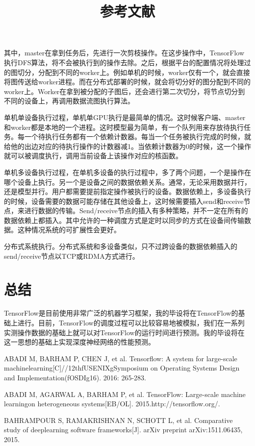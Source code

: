 其中，master在拿到任务后，先进行一次剪枝操作。在这步操作中，TensorFlow执行DFS算法，将不会被执行到的操作去除。之后，根据平台的配置情况将处理过的图切分，分配到不同的worker上。例如单机的时候，worker仅有一个，就会直接将图传送给worker进程。而在分布式部署的时候，就会将切分好的图分配到不同的worker上。Worker在拿到被分配的子图后，还会进行第二次切分，将节点切分到不同的设备上，再调用数据流图执行算法。

单机单设备执行过程，单机单GPU执行是最简单的情况。这时候客户端、master和worker都是本地的一个进程。这时模型最为简单，有一个队列用来存放待执行任务。每一个待执行任务都有一个依赖计数器。每当一个任务被执行完成的时候，就给他的出边对应的待执行操作的计数器减1。当依赖计数器为0的时候，这一个操作就可以被调度执行，调用当前设备上该操作对应的核函数。

单机多设备执行过程，在单机多设备的执行过程中，多了两个问题，一个是操作在哪个设备上执行。另一个是设备之间的数据依赖关系。通常，无论采用数据并行，还是模型并行。用户都需要提前指定操作被执行的设备。数据依赖上，多设备执行的时候，设备需要的数据可能存储在其他设备上，这时候需要插入send和receive节点，来进行数据的传输。Send/receive节点的插入有多种策略，并不一定在所有的数据依赖上都插入。其中允许的一种调度方式是定时以同步的方式在设备间传输数据。这种情况系统的可扩展性会更好。

分布式系统执行。分布式系统和多设备类似，只不过跨设备的数据依赖插入的send/receive节点以TCP或RDMA方式进行。

\section{总结}

TensorFlow是目前使用非常广泛的机器学习框架，我的毕设将在TensorFlow的基础上进行。目前，TensorFlow的调度过程可以比较容易地被模拟，我们在一系列实测操作数据的基础上就可以对TensorFlow的运行时间进行预测。我的毕设将在这一思想的基础上实现深度神经网络的性能预测。

\title{参考文献}

\begin{translationbib}
    \item ABADI M, BARHAM P, CHEN J, et al. Tensorflow: A system for large-scale machinelearning[C]//12thfUSENIXgSymposium on Operating Systems Design and Implementation(fOSDIg16). 2016: 265-283.
    \item ABADI M, AGARWAL A, BARHAM P, et al. TensorFlow: Large-scale machine learningon heterogeneous systems[EB/OL]. 2015.http://tensorflow.org/.
    \item BAHRAMPOUR S, RAMAKRISHNAN N, SCHOTT L, et al. Comparative study of deeplearning software frameworks[J]. arXiv preprint arXiv:1511.06435, 2015.
\end{translationbib}
